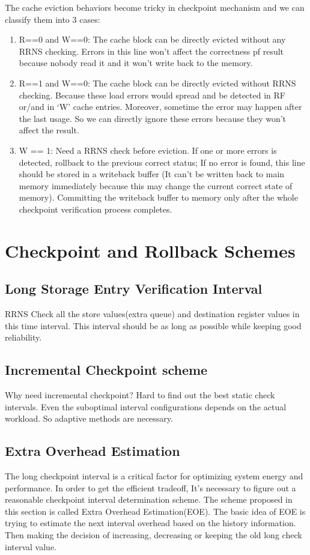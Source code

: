\documentclass{sig-alternate}
\begin{document}
The cache eviction behaviors become tricky in checkpoint mechanism and we can classify them into 3 cases: 
\begin{enumerate}
\item R==0 and W==0: The cache block can be directly evicted without any RRNS checking. Errors in this line won't affect the correctness pf result because nobody read it and it won't write back to the memory.  
\item R==1 and W==0: The cache block can be directly evicted without RRNS checking. Because these load errors would spread and be detected in RF or/and in `W' cache entries. Moreover, sometime the error may happen after the last usage. So we can directly ignore these errors because they won't affect the result.  
\item W == 1: Need a RRNS check before eviction. If one or more errors is detected, rollback to the previous correct status; If no error is found, this line should be stored in a writeback buffer (It can't be written back to main memory immediately because this may change the current correct state of memory). Committing the writeback buffer to memory only after the whole checkpoint verification process completes.   
\end{enumerate}

\section{Checkpoint and Rollback Schemes}
\label{Chptschemes}
\subsection{Long Storage Entry Verification Interval}
RRNS Check all the store values(extra queue) and destination register values in this time interval. This interval should be as long as possible while keeping good reliability. 
\subsection{Incremental Checkpoint scheme}
 \label{Inc_chpt}
Why need incremental checkpoint?
Hard to find out the best static check intervals. Even the suboptimal interval configurations depends on the actual workload. So adaptive methods are necessary.

\subsection{Extra Overhead Estimation}
The long checkpoint interval is a critical factor for optimizing system energy and performance. In order to get the efficient tradeoff, It's necessary to figure out a reasonable checkpoint interval determination scheme. The scheme proposed in this section is called Extra Overhead Estimation(EOE). The basic idea of EOE is trying to estimate the next interval overhead based on the history information. Then making the decision of increasing, decreasing or keeping the old long check interval value. 
\end{document}
